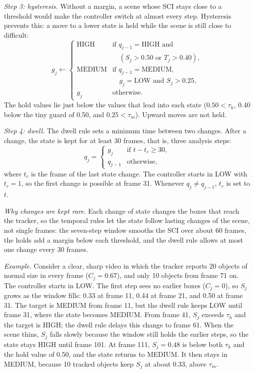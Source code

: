 \documentclass[journal]{new-aiaa}
\begin{document}
\emph{Step 3: hysteresis.} Without a margin, a scene whose SCI stays close to
a threshold would make the controller switch at almost every step.
Hysteresis prevents this: a move to a lower state is held while the scene is
still close to difficult:
\begin{equation}
g_j\leftarrow\begin{cases}
\text{HIGH}   & \text{if } q_{j-1}=\text{HIGH} \text{ and}\\
              & \quad (S_j>0.50 \text{ or } T_j>0.40),\\
\text{MEDIUM} & \text{if } q_{j-1}=\text{MEDIUM},\\
              & \quad g_j=\text{LOW} \text{ and } S_j>0.25,\\
g_j           & \text{otherwise.}
\end{cases}
\label{eq:hold}
\end{equation}
The hold values lie just below the values that lead into each state
($0.50<\tau_h$, 0.40 below the tiny guard of 0.50, and $0.25<\tau_m$).
Upward moves are not held.

\emph{Step 4: dwell.} The dwell rule sets a minimum time between two changes.
After a change, the state is kept for at least 30 frames, that is, three
analysis steps:
\begin{equation}
q_j=\begin{cases}
g_j     & \text{if } t-t_c\ge30,\\
q_{j-1} & \text{otherwise,}
\end{cases}
\label{eq:dwell}
\end{equation}
where $t_c$ is the frame of the last state change. The controller starts in
LOW with $t_c=1$, so the first change is possible at frame 31. Whenever
$q_j\ne q_{j-1}$, $t_c$ is set to $t$.

\emph{Why changes are kept rare.} Each change of state changes the boxes that
reach the tracker, so the temporal rules let the state follow lasting changes
of the scene, not single frames: the seven-step window smooths the SCI over
about 60 frames, the holds add a margin below each threshold, and the dwell
rule allows at most one change every 30 frames.

\emph{Example.} Consider a clear, sharp video in which the tracker reports 20
objects of normal size in every frame ($C_j=0.67$), and only 10 objects from
frame 71 on. The controller starts in LOW. The first step sees no earlier
boxes ($C_j=0$), so $S_j$ grows as the window fills: 0.33 at frame 11, 0.44
at frame 21, and 0.50 at frame 31. The target is MEDIUM from frame 11, but the
dwell rule keeps LOW until frame 31, where the state becomes MEDIUM. From
frame 41, $S_j$ exceeds $\tau_h$ and the target is HIGH; the dwell rule delays
this change to frame 61. When the scene thins, $S_j$ falls slowly because the
window still holds the earlier steps, so the state stays HIGH until frame 101.
At frame 111, $S_j=0.48$ is below both $\tau_h$ and the hold value of 0.50,
and the state returns to MEDIUM. It then stays in MEDIUM, because 10 tracked
objects keep $S_j$ at about 0.33, above $\tau_m$.
\end{document}
